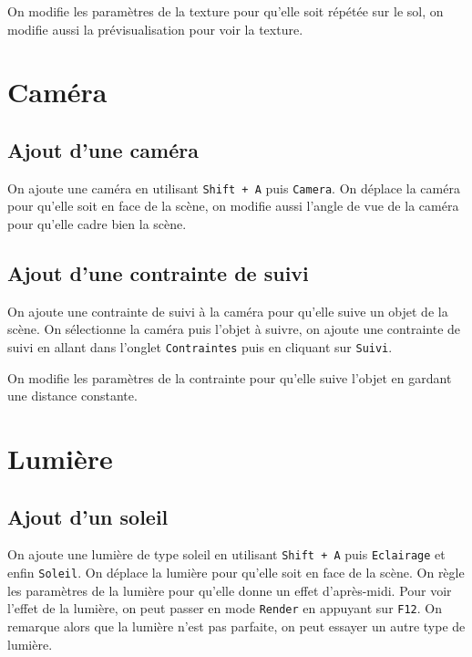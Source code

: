 \documentclass[french,a4paper,10pt]{article}
\begin{document}
    On modifie les paramètres de la texture pour qu'elle soit répétée sur le sol, on modifie aussi la prévisualisation pour
    voir la texture.

    \section{Caméra}\label{sec:3}

    \subsection{Ajout d'une caméra}\label{subsec:3.1}

    On ajoute une caméra en utilisant \texttt{Shift + A} puis \texttt{Camera}.
    On déplace la caméra pour qu'elle soit en face de la scène, on modifie aussi l'angle de vue de la caméra pour qu'elle
    cadre bien la scène.

    \subsection{Ajout d'une contrainte de suivi}\label{subsec:3.2}

    On ajoute une contrainte de suivi à la caméra pour qu'elle suive un objet de la scène.
    On sélectionne la caméra puis l'objet à suivre, on ajoute une contrainte de suivi en allant dans l'onglet
    \texttt{Contraintes} puis en cliquant sur \texttt{Suivi}.

    On modifie les paramètres de la contrainte pour qu'elle suive l'objet en gardant une distance constante.

    \section{Lumière}\label{sec:4}

    \subsection{Ajout d'un soleil}\label{subsec:4.1}

    On ajoute une lumière de type soleil en utilisant \texttt{Shift + A} puis \texttt{Eclairage} et enfin \texttt{Soleil}.
    On déplace la lumière pour qu'elle soit en face de la scène.
    On règle les paramètres de la lumière pour qu'elle donne un effet d'après-midi.
    Pour voir l'effet de la lumière, on peut passer en mode \texttt{Render} en appuyant sur \texttt{F12}.
    On remarque alors que la lumière n'est pas parfaite, on peut essayer un autre type de lumière.
\end{document}
